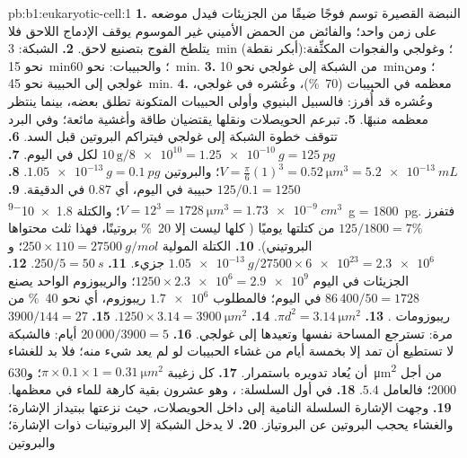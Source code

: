 \begin{solution}{pb:b1:eukaryotic-cell:1}
\textbf{1.} النبضة القصيرة توسم فوجًا ضيقًا من الجزيئات فيدل موضعه
على زمن واحد؛ والفائض من الحمض الأميني غير الموسوم يوقف الإدماج
اللاحق فلا يتلطخ الفوج بتصنيع لاحق.
\textbf{2.} الشبكة: \qty{3}{min} (أبكر نقطة)؛ وغولجي والفجوات
المكثِّفة: نحو \qty{15}{min}؛ والحبيبات: نحو \qty{60}{min}.
\textbf{3.} من الشبكة إلى غولجي نحو \qty{10}{min}؛ ومن غولجي إلى
الحبيبة نحو \qty{45}{min}.
\textbf{4.} معظمه في الحبيبات (\qty{70}{\%})، وعُشره في غولجي،
وعُشره قد أُفرز: فالسبيل البنيوي وأولى الحبيبات المتكونة تطلق بعضه،
بينما ينتظر معظمه منبهًا.
\textbf{5.} تبرعم الحويصلات ونقلها يقتضيان طاقة وأغشية مائعة؛ وفي
البرد تتوقف خطوة الشبكة إلى غولجي فيتراكم البروتين قبل السد.
\textbf{6.} $10\,\mathrm{g}/\num{8e10} = \qty{1.25e-10}{g} =
\qty{125}{pg}$ لكل  في اليوم.
\textbf{7.} $V = \frac{\pi}{6}(1)^3 = \qty{0.52}{\micro m^3} =
\qty{5.2e-13}{mL}$؛ والبروتين $\qty{1.05e-13}{g} = \qty{0.1}{pg}$.
\textbf{8.} $125/0.1 = 1250$ حبيبة في اليوم، أي $0.87$ في الدقيقة.
\textbf{9.} $V = 12^3 = \qty{1728}{\micro m^3} = \qty{1.73e-9}{cm^3}$؛
والكتلة \qty{1.8e-9}{g} = \qty{1800}{pg}. فتفرز $125/1800 = 7\%$ من
كتلتها يوميًا ( كلها ليست إلا \qty{20}{\%} بروتينًا، فهذا ثلث
محتواها البروتيني).
\textbf{10.} الكتلة المولية $250\times 110 = \qty{27500}{g/mol}$؛
و$\qty{1.05e-13}{g}/27500\times\num{6e23} = \num{2.3e6}$ جزيء.
\textbf{11.} $250/5 = \qty{50}{s}$.
\textbf{12.} الجزيئات في اليوم $1250\times\num{2.3e6} = \num{2.9e9}$؛
والريبوزوم الواحد يصنع $86\,400/50 = 1728$ في اليوم؛ فالمطلوب
$\num{1.7e6}$ ريبوزوم، أي نحو \qty{40}{\%} من ريبوزومات .
\textbf{13.} $\pi d^2 = \qty{3.14}{\micro m^2}$.
\textbf{14.} $1250\times 3.14 = \qty{3900}{\micro m^2}$.
\textbf{15.} $3900/144 = 27$ مرة:  تسترجع المساحة نفسها
 وتعيدها إلى غولجي.
\textbf{16.} $20\,000/3900 = 5$ أيام: فالشبكة لا تستطيع أن تمد إلا
بخمسة أيام من غشاء الحبيبات لو لم يعد شيء منه؛ فلا بد للغشاء أن
يُعاد تدويره باستمرار.
\textbf{17.} كل زغيبة $\pi\times 0.1\times 1 =
\qty{0.31}{\micro m^2}$؛ و\qty{630}{\micro m^2} من أجل 2000؛ فالعامل
$5.4$.
\textbf{18.} في أول السلسلة: ، وهو عشرون بقية كارهة
للماء في معظمها.
\textbf{19.} وجهت الإشارة السلسلة النامية إلى داخل الحويصلات، حيث
نزعتها ببتيداز الإشارة؛ والغشاء يحجب البروتين عن البروتياز.
\textbf{20.} لا يدخل الشبكة إلا البروتينات ذوات الإشارة؛ والبروتين

\end{solution}
